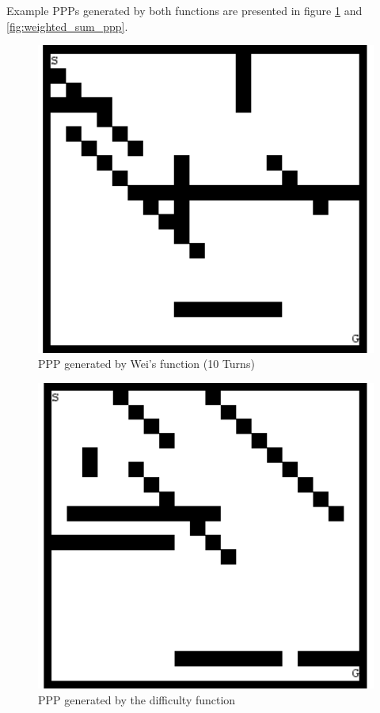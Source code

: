 \documentclass[authoryearcitations]{UoYCSproject}
\begin{document}
Example PPPs generated by both functions are presented in figure \ref{fig:wei_ppp} and \ref{fig:weighted_sum_ppp}.

\begin{figure}
\graphicspath{ {EvalPics/} }
\includegraphics[width=1\textwidth]{wei_26.png}
\caption{PPP generated by Wei's function (10 Turns)}
\label{fig:wei_ppp}
\end{figure}

\begin{figure}
\graphicspath{ {EvalPics/} }
\includegraphics[width=1\textwidth]{openh_46.png}
\caption{PPP generated by the difficulty function}
\label{fig:difficulty_ppp}
\end{figure}
\end{document}
